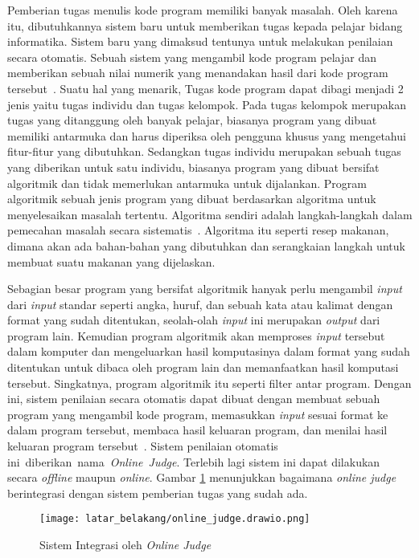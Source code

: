 Pemberian tugas menulis kode program memiliki banyak masalah. Oleh karena itu, dibutuhkannya sistem baru untuk memberikan tugas kepada pelajar bidang informatika. Sistem baru yang dimaksud tentunya untuk melakukan penilaian secara otomatis. Sebuah sistem yang mengambil kode program pelajar dan memberikan sebuah nilai numerik yang menandakan hasil dari kode program tersebut~\cite{kurnia:onlinejudge}. Suatu hal yang menarik, Tugas kode program dapat dibagi menjadi 2 jenis yaitu tugas individu dan tugas kelompok. Pada tugas kelompok merupakan tugas yang ditanggung oleh banyak pelajar, biasanya program yang dibuat memiliki antarmuka dan harus diperiksa oleh pengguna khusus yang mengetahui fitur-fitur yang dibutuhkan. Sedangkan tugas individu merupakan sebuah tugas yang diberikan untuk satu individu, biasanya program yang dibuat bersifat algoritmik dan tidak memerlukan antarmuka untuk dijalankan. Program algoritmik sebuah jenis program yang dibuat berdasarkan algoritma untuk menyelesaikan masalah tertentu. Algoritma sendiri adalah langkah-langkah dalam pemecahan masalah secara sistematis~\cite{idcloudhost:algorithm}.
Algoritma itu seperti resep makanan, dimana akan ada bahan-bahan yang dibutuhkan dan serangkaian langkah untuk membuat suatu makanan yang dijelaskan.

Sebagian besar program yang bersifat algoritmik hanyak perlu mengambil \textit{input} dari \textit{input} standar seperti angka, huruf, dan sebuah kata atau kalimat dengan format yang sudah ditentukan, seolah-olah \textit{input} ini merupakan \textit{output} dari program lain. Kemudian program algoritmik akan memproses \textit{input} tersebut dalam komputer dan mengeluarkan hasil komputasinya dalam format yang sudah ditentukan untuk dibaca oleh program lain dan memanfaatkan hasil komputasi tersebut. Singkatnya, program algoritmik itu seperti filter antar program. Dengan ini, sistem penilaian secara otomatis dapat dibuat dengan membuat sebuah program yang mengambil kode program, memasukkan \textit{input} sesuai format ke dalam program tersebut, membaca hasil keluaran program, dan menilai hasil keluaran program tersebut~\cite{kurnia:onlinejudge}. Sistem penilaian otomatis \mbox{ini diberikan nama \textit{Online Judge}}. Terlebih lagi sistem ini dapat dilakukan secara \textit{offline} maupun \textit{online}. Gambar \ref{fig:1:onlinejudge} menunjukkan bagaimana \textit{online judge} berintegrasi dengan sistem pemberian tugas yang sudah ada.

\begin{figure}[H]
    \centering
    \texttt{[image: latar\_belakang/online\_judge.drawio.png]}
    \caption[Sistem Integrasi oleh \textit{Online Judge}]{Sistem Integrasi oleh \textit{Online Judge}}
    \label{fig:1:onlinejudge}
\end{figure}

